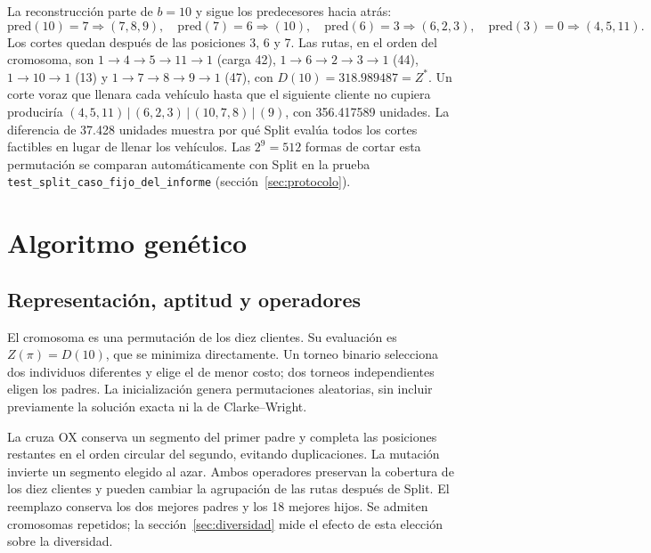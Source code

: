 \documentclass[11pt,a4paper]{article}
\numberwithin{equation}{section}
\begin{document}
\begin{table}[H]\centering\small
\caption{Etiquetas de Split para \(\pi=(4,5,11,6,2,3,10,7,8,9)\). La columna \(w_{ab}\) es el costo de la última ruta, definida por \(a=\mathrm{pred}(b)+1\).}\label{tab:splitdp}

\end{table}

\begin{table}[H]\centering\small
\caption{Candidatos evaluados para la etiqueta \(D(7)\).}\label{tab:splitb7}

\end{table}

La reconstrucción parte de \(b=10\) y sigue los predecesores hacia atrás:
\[
\mathrm{pred}(10)=7\Rightarrow(7,8,9),\quad
\mathrm{pred}(7)=6\Rightarrow(10),\quad
\mathrm{pred}(6)=3\Rightarrow(6,2,3),\quad
\mathrm{pred}(3)=0\Rightarrow(4,5,11).
\]
Los cortes quedan después de las posiciones 3, 6 y 7. Las rutas, en el orden del cromosoma, son \(1\to4\to5\to11\to1\) (carga 42), \(1\to6\to2\to3\to1\) (44), \(1\to10\to1\) (13) y \(1\to7\to8\to9\to1\) (47), con \(D(10)=318.989487=Z^*\). Un corte voraz que llenara cada vehículo hasta que el siguiente cliente no cupiera produciría \((4,5,11)\,|\,(6,2,3)\,|\,(10,7,8)\,|\,(9)\), con 356.417589 unidades. La diferencia de 37.428 unidades muestra por qué Split evalúa todos los cortes factibles en lugar de llenar los vehículos. Las \(2^9=512\) formas de cortar esta permutación se comparan automáticamente con Split en la prueba \texttt{test\_split\_caso\_fijo\_del\_informe} (sección~\ref{sec:protocolo}).

\section{Algoritmo genético}

\subsection{Representación, aptitud y operadores}

El cromosoma es una permutación de los diez clientes. Su evaluación es \(Z(\pi)=D(10)\), que se minimiza directamente. Un torneo binario selecciona dos individuos diferentes y elige el de menor costo; dos torneos independientes eligen los padres. La inicialización genera permutaciones aleatorias, sin incluir previamente la solución exacta ni la de Clarke--Wright.

La cruza OX conserva un segmento del primer padre y completa las posiciones restantes en el orden circular del segundo, evitando duplicaciones. La mutación invierte un segmento elegido al azar. Ambos operadores preservan la cobertura de los diez clientes y pueden cambiar la agrupación de las rutas después de Split. El reemplazo conserva los dos mejores padres y los 18 mejores hijos. Se admiten cromosomas repetidos; la sección~\ref{sec:diversidad} mide el efecto de esta elección sobre la diversidad.
\end{document}
